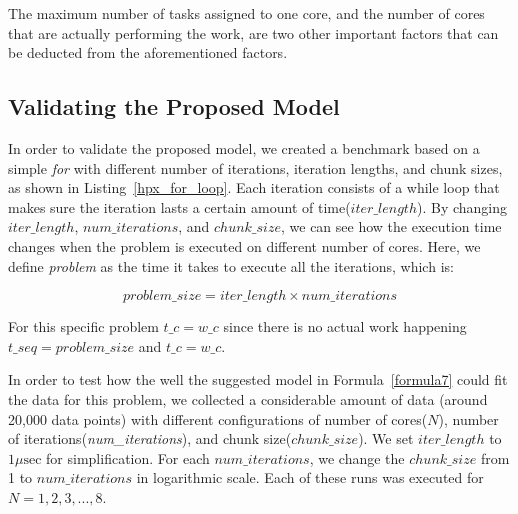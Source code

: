 The maximum number of tasks assigned to one core, and the number of cores that are actually performing the work, are two other important factors that can be deducted from the aforementioned factors. 


\vspace{\baselineskip}
\subsection{Validating the Proposed Model}
In order to validate the proposed model, we created a benchmark based on a simple \textit{for} with different number of iterations, iteration lengths, and chunk sizes, as shown in Listing~\ref{hpx_for_loop}. 
Each iteration consists of a while loop that makes sure the iteration lasts a certain amount of time($iter\_{length}$). By changing $iter\_{length}$, $num\_{iterations}$, and $chunk\_{size}$, we can see how the execution time changes when the problem is executed on different number of cores. Here, we define \textit{problem} as the time it takes to execute all the iterations, which is:

\begin{equation}\label{problem_size}
problem\_size = iter\_length\times{num\_iterations}
\end{equation}

For this specific problem $t\_c=w\_c$ since there is no actual work happening  $t\_{seq}=problem\_{size}$ and $t\_c=w\_c$.
 
In order to test how the well the suggested model in Formula~\ref{formula7} could fit the data for this problem, we collected a considerable amount of data (around 20,000 data points) with different configurations of number of cores($N$), number of iterations(\emph{num\_{iterations}}), and chunk size($chunk\_{size}$). We set $iter\_{length}$ to $1\mu\text{sec}$ for simplification. For each $num\_{iterations}$, we change the $chunk\_{size}$ from 1 to $num\_{iterations}$ in logarithmic scale. Each of these runs was executed for $N=1,2,3,...,8$.  

